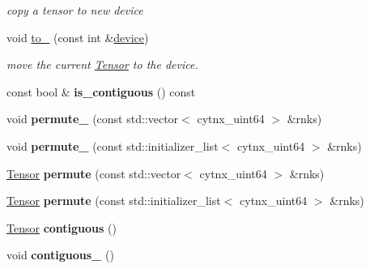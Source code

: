 \begin{DoxyCompactItemize}
\begin{DoxyCompactList}\small\item\em copy a tensor to new device \end{DoxyCompactList}\item 
void \hyperlink{classcytnx_1_1Tensor_a114a31fbb8bf4a90f150b6a67e42183a}{to\+\_\+} (const int \&\hyperlink{classcytnx_1_1Tensor_ac6d3310eb4defbdacf662dcd81d8fe09}{device})
\begin{DoxyCompactList}\small\item\em move the current \hyperlink{classcytnx_1_1Tensor}{Tensor} to the device. \end{DoxyCompactList}\item 
\mbox{\label{classcytnx_1_1Tensor_a6a1d9ed962b0e9a484e2bb0de15eb76d}} 
const bool \& {\bfseries is\+\_\+contiguous} () const
\item 
\mbox{\label{classcytnx_1_1Tensor_a18f27d1fff73e4fb4109bc8faf3b5ace}} 
void {\bfseries permute\+\_\+} (const std\+::vector$<$ cytnx\+\_\+uint64 $>$ \&rnks)
\item 
\mbox{\label{classcytnx_1_1Tensor_a675d2a131c8c49fe748525edf21cab1e}} 
void {\bfseries permute\+\_\+} (const std\+::initializer\+\_\+list$<$ cytnx\+\_\+uint64 $>$ \&rnks)
\item 
\mbox{\label{classcytnx_1_1Tensor_a6bab89872014cf91dba63b38d9a2b3ea}} 
\hyperlink{classcytnx_1_1Tensor}{Tensor} {\bfseries permute} (const std\+::vector$<$ cytnx\+\_\+uint64 $>$ \&rnks)
\item 
\mbox{\label{classcytnx_1_1Tensor_a436838e8123d399c42e2de08ee46d687}} 
\hyperlink{classcytnx_1_1Tensor}{Tensor} {\bfseries permute} (const std\+::initializer\+\_\+list$<$ cytnx\+\_\+uint64 $>$ \&rnks)
\item 
\mbox{\label{classcytnx_1_1Tensor_a127e50508e1ee0eadf11601d66d76988}} 
\hyperlink{classcytnx_1_1Tensor}{Tensor} {\bfseries contiguous} ()
\item 
\mbox{\label{classcytnx_1_1Tensor_a405470654ef4ef5fc0b1d24754a3daf9}} 
void {\bfseries contiguous\+\_\+} ()
\item 

\end{DoxyCompactItemize}
